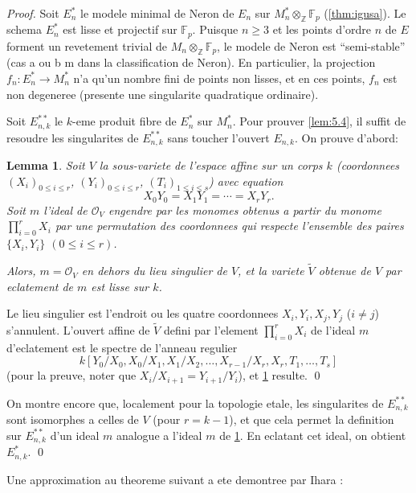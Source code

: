 \documentclass[11pt,reqno]{amsart}
\theoremstyle{plain}
\newtheorem{lemma}[theorem]{Lemma}
\theoremstyle{remark}
\newcommand{\shO}{\mathcal{O}}
\newcommand{\Z}{\mathbb{Z}}
\newcommand{\F}{\mathbb{F}}
\numberwithin{equation}{section}
\begin{document}
\begin{proof}
Soit $E_n^*$ le modele minimal de Neron de $E_n$ sur $M_n^* \otimes_\Z \F_p$ (\ref{thm:igusa}). Le schema $E_n^*$ est lisse et projectif sur $\F_p$. Puisque $n \geq 3$ et les points d'ordre $n$ de $E$ forment un revetement trivial de $M_n \otimes_\Z \F_p$, le modele de Neron est ``semi-stable'' (cas a ou b m dans la classification de Neron). En particulier, la projection $f_n: E_n^* \to M_n^*$ n'a qu'un nombre fini de points non lisses, et en ces points, $f_n$ est non degeneree (presente une singularite quadratique ordinaire).

Soit $E_{n,k}^{**}$ le $k$-eme produit fibre de $E_n^*$ sur $M_n^*$. Pour prouver \ref{lem:5.4}, il suffit de resoudre les singularites de $E_{n,k}^{**}$ sans toucher l'ouvert $E_{n,k}$. On prouve d'abord:

\begin{lemma}\label{lem:5.5}
Soit $V$ la sous-variete de l'espace affine sur un corps $k$ (coordonnees $(X_i)_{0 \leq i \leq r}$, $(Y_i)_{0 \leq i \leq r}$, $(T_i)_{1 \leq i \leq s}$) avec equation
\[
X_0 Y_0 = X_1 Y_1 = \cdots = X_r Y_r.
\]
Soit $m$ l'ideal de $\shO_V$ engendre par les monomes obtenus a partir du monome $\prod_{i=0}^r X_i$ par une permutation des coordonnees qui respecte l'ensemble des paires $\{X_i, Y_i\}$ $(0 \leq i \leq r)$.

Alors, $m = \shO_V$ en dehors du lieu singulier de $V$, et la variete $\tilde{V}$ obtenue de $V$ par eclatement de $m$ est lisse sur $k$.
\end{lemma}

Le lieu singulier est l'endroit ou les quatre coordonnees $X_i, Y_i, X_j, Y_j$ ($i \neq j$) s'annulent. L'ouvert affine de $\tilde{V}$ defini par l'element $\prod_{i=0}^r X_i$ de l'ideal $m$ d'eclatement est le spectre de l'anneau regulier
\[
k[Y_0/X_0, X_0/X_1, X_1/X_2, \ldots, X_{r-1}/X_r, X_r, T_1, \ldots, T_s]
\]
(pour la preuve, noter que $X_i/X_{i+1} = Y_{i+1}/Y_i$), et \ref{lem:5.5} resulte. \qed

On montre encore que, localement pour la topologie etale, les singularites de $E_{n,k}^{**}$ sont isomorphes a celles de $V$ (pour $r = k - 1$), et que cela permet la definition sur $E_{n,k}^{**}$ d'un ideal $m$ analogue a l'ideal $m$ de \ref{lem:5.5}. En eclatant cet ideal, on obtient $E_{n,k}^*$. \qed
\end{proof}

Une approximation au theoreme suivant a ete demontree par Ihara \cite{Ihara}:
\end{document}
